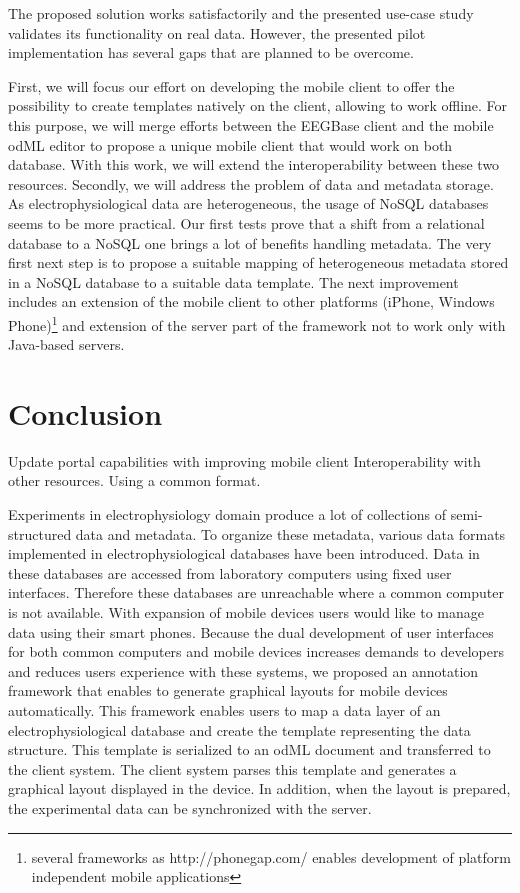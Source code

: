 \documentclass[conference]{IEEEtran}
\begin{document}
The proposed solution works satisfactorily and the presented use-case study validates its functionality on real data. However, the presented pilot implementation has several gaps that are planned to be overcome. 

First, we will focus our effort on developing the mobile client to offer the possibility to create templates natively on the client, allowing to work offline. For this purpose, we will merge efforts between the EEGBase client and the mobile odML editor \cite{10.3389/conf.fninf.2014.18.00053} to propose a unique mobile client that would work on both database. With this work, we will extend the interoperability between these two resources.
Secondly, we will address the problem of data and metadata storage. As electrophysiological data are heterogeneous, the usage of NoSQL databases seems to be more practical. Our first tests prove \cite{Jezek2014422} that a shift from a relational database to a NoSQL one brings a lot of benefits handling metadata. The very first next step is to propose a suitable mapping of heterogeneous metadata stored in a NoSQL database to a suitable data template. The next improvement includes an extension of the mobile client to other platforms (iPhone, Windows Phone)\footnote{several frameworks as http://phonegap.com/ enables development of platform independent mobile applications} and extension of the server part of the framework not to work only with Java-based servers.



\section{Conclusion}

Update portal capabilities with improving mobile client
Interoperability with other resources. Using a common format.

Experiments in electrophysiology domain produce a lot of collections of semi-structured data and metadata. To organize these metadata, various data formats implemented in electrophysiological databases have been introduced. Data in these databases are accessed from laboratory computers using fixed user interfaces. Therefore these databases are unreachable where a common computer is not available. With expansion of mobile devices users would like to manage data using their smart phones. Because the dual development of user interfaces for both common computers and mobile devices increases demands to developers and reduces users experience with these systems, we proposed an annotation framework that enables to generate graphical layouts for mobile devices automatically. This framework enables users to map a data layer of an electrophysiological database and create the template representing the data structure. This template is serialized to an odML document and transferred to the client system. The client system parses this template and generates a graphical layout displayed in the device. In addition, when the layout is prepared, the experimental data can be synchronized with the server.
\end{document}
